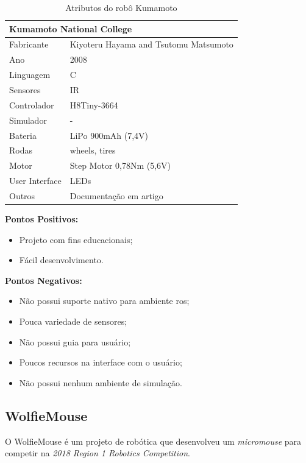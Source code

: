 \begin{table}[H]
	\centering
	\caption{Atributos do robô Kumamoto}
	\begin{tabular}{|l|l|}
		\hline
		\multicolumn{2}{|l|}{\textbf{Kumamoto National College}} \\ \hline
		Fabricante & Kiyoteru Hayama and Tsutomu Matsumoto \\ \hline
		Ano & 2008 \\ \hline
		Linguagem & C \\ \hline
		Sensores & IR \\ \hline
		Controlador & H8Tiny-3664 \\ \hline
		Simulador & - \\ \hline
		Bateria & LiPo 900mAh (7,4V) \\ \hline
		Rodas & wheels, tires \\ \hline
		Motor & Step Motor 0,78Nm (5,6V) \\ \hline
		User Interface & LEDs \\ \hline
		Outros & Documentação em artigo \\ \hline
	\end{tabular}
	\label{tab:Kumamoto}
\end{table}



\textbf{Pontos Positivos:}
\begin{itemize}
	\item Projeto com fins educacionais;
	\item Fácil desenvolvimento.
\end{itemize}

\textbf{Pontos Negativos:}
\begin{itemize}
	\item Não possui suporte nativo para ambiente \gls*{ros};
	\item Pouca variedade de sensores;
	\item Não possui guia para usuário;
	\item Poucos recursos na interface com o usuário;
	\item Não possui nenhum ambiente de simulação.
\end{itemize}


\subsection{WolfieMouse}
\hspace{0.5cm} O WolfieMouse é um projeto de robótica que desenvolveu um \textit{micromouse} para competir na \textit{2018 Region 1 Robotics Competition}.


